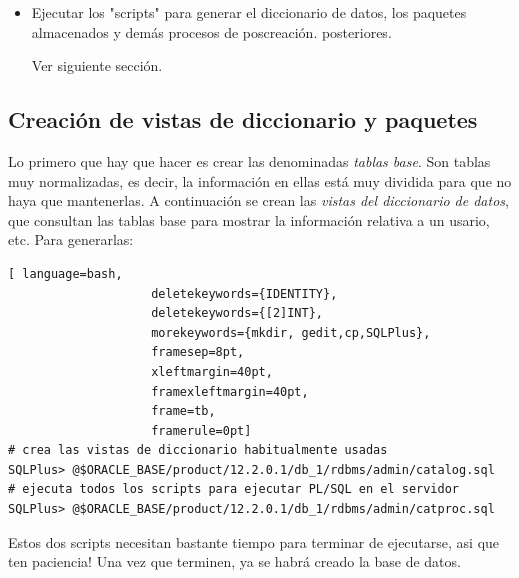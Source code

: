 \begin{itemize}
\begin{lstlisting}
default temporary tablespace temp
tempfile '/databases/app/oracle/oradata/prueba/temp01.dbf' size 20M reuse
undo tablespace undotbs1
datafile '/databases/app/oracle/oradata/prueba/undotbs1g01.dbf' size 50m reuse autoextend on next 5120k maxsize unlimited;
\end{lstlisting}
Ese archivo sql se puede bajar desde \url{https://decsai.ugr.es/~iblanco/scriptBD.sql}. Para ejecutarlo:
\begin{lstlisting}[ language=bash,
                    deletekeywords={IDENTITY},
                    deletekeywords={[2]INT},
                    morekeywords={mkdir, gedit,cp,sqlplus},
                    framesep=8pt,
                    xleftmargin=40pt,
                    framexleftmargin=40pt,
                    frame=tb,
                    framerule=0pt]
@/home/oracle/Descargas/scriptBD.sql
\end{lstlisting}
\item Ejecutar los "scripts" para generar el diccionario de datos, los paquetes almacenados y demás procesos de poscreación. posteriores.

Ver siguiente sección.
\end{itemize}

\subsection{Creación de vistas de diccionario y paquetes}

Lo primero que hay que hacer es crear las denominadas \textit{tablas base}. Son tablas muy normalizadas, es decir, la información en ellas está muy dividida para que no haya que mantenerlas. A continuación se crean las \textit{vistas del diccionario de datos}, que consultan las tablas base para mostrar la información relativa a un usario, etc. Para generarlas: 
\begin{lstlisting}[ language=bash,
                    deletekeywords={IDENTITY},
                    deletekeywords={[2]INT},
                    morekeywords={mkdir, gedit,cp,SQLPlus},
                    framesep=8pt,
                    xleftmargin=40pt,
                    framexleftmargin=40pt,
                    frame=tb,
                    framerule=0pt]
# crea las vistas de diccionario habitualmente usadas
SQLPlus> @$ORACLE_BASE/product/12.2.0.1/db_1/rdbms/admin/catalog.sql
# ejecuta todos los scripts para ejecutar PL/SQL en el servidor
SQLPlus> @$ORACLE_BASE/product/12.2.0.1/db_1/rdbms/admin/catproc.sql
\end{lstlisting}
Estos dos scripts necesitan bastante tiempo para terminar de ejecutarse, asi que ten paciencia! Una vez que terminen, ya se habrá creado la base de datos.

